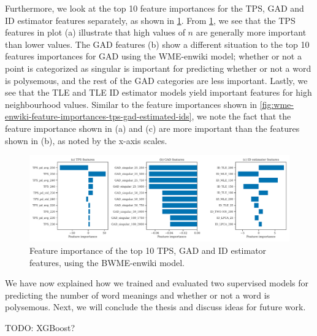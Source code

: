 Furthermore, we look at the top 10 feature importances for the TPS, GAD and ID estimator features separately, as shown in \cref{fig:bwme-enwiki-feature-importances-tps-gad-estimated-ids}. From \cref{fig:bwme-enwiki-feature-importances-tps-gad-estimated-ids}, we see that the TPS features in plot (a) illustrate that high values of $n$ are generally more important than lower values. The GAD features (b) show a different situation to the top 10 features importances for GAD using the WME-enwiki model; whether or not a point is categorized as singular is important for predicting whether or not a word is polysemous, and the rest of the GAD categories are less important. Lastly, we see that the TLE and TLE ID estimator models yield important features for high neighbourhood values. Similar to the feature importances shown in \cref{fig:wme-enwiki-feature-importances-tps-gad-estimated-ids}, we note the fact that the feature importance shown in (a) and (c) are more important than the features shown in (b), as noted by the x-axis scales.
\begin{figure}[H]
    \centering
    \includegraphics[width=\textwidth]{thesis/figures/bwme-enwiki-top-10-feature-importances-tps-gad-estimated-ids.pdf}
    \caption{Feature importance of the top 10 TPS, GAD and ID estimator features, using the BWME-enwiki model.}
    \label{fig:bwme-enwiki-feature-importances-tps-gad-estimated-ids}
\end{figure}

We have now explained how we trained and evaluated two supervised models for predicting the number of word meanings and whether or not a word is polysemous. Next, we will conclude the thesis and discuss ideas for future work.

TODO: XGBoost?